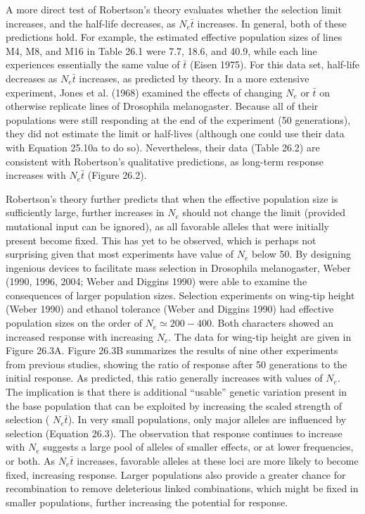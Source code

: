 \documentclass{article}
\begin{document}
A more direct test of Robertson’s theory evaluates whether the selection limit increases, and the half-life decreases, as  $ N_{e}\bar{t} $ increases. In general, both of these predictions hold. For example, the estimated effective population sizes of lines M4, M8, and M16 in Table 26.1 were 7.7, 18.6, and 40.9, while each line experiences essentially the same value of  $ \bar{t} $ (Eisen 1975). For this data set, half-life decreases as  $ N_{e}\bar{t} $ increases, as predicted by theory. In a more extensive experiment, Jones et al. (1968) examined the effects of changing  $ N_{e} $ or  $ \bar{t} $ on otherwise replicate lines of Drosophila melanogaster. Because all of their populations were still responding at the end of the experiment (50 generations), they did not estimate the limit or half-lives (although one could use their data with Equation 25.10a to do so). Nevertheless, their data (Table 26.2) are consistent with Robertson’s qualitative predictions, as long-term response increases with  $ N_{e}\bar{t} $ (Figure 26.2).

Robertson's theory further predicts that when the effective population size is sufficiently large, further increases in  $ N_e $ should not change the limit (provided mutational input can be ignored), as all favorable alleles that were initially present become fixed. This has yet to be observed, which is perhaps not surprising given that most experiments have value of  $ N_e $ below 50. By designing ingenious devices to facilitate mass selection in Drosophila melanogaster, Weber (1990, 1996, 2004; Weber and Diggins 1990) were able to examine the consequences of larger population sizes. Selection experiments on wing-tip height (Weber 1990) and ethanol tolerance (Weber and Diggins 1990) had effective population sizes on the order of  $ N_e \simeq 200-400 $. Both characters showed an increased response with increasing  $ N_e $. The data for wing-tip height are given in Figure 26.3A. Figure 26.3B summarizes the results of nine other experiments from previous studies, showing the ratio of response after 50 generations to the initial response. As predicted, this ratio generally increases with values of  $ N_e $. The implication is that there is additional “usable” genetic variation present in the base population that can be exploited by increasing the scaled strength of selection ( $ N_e \bar{t} $). In very small populations, only major alleles are influenced by selection (Equation 26.3). The observation that response continues to increase with  $ N_e $ suggests a large pool of alleles of smaller effects, or at lower frequencies, or both. As  $ N_e \bar{t} $ increases, favorable alleles at these loci are more likely to become fixed, increasing response. Larger populations also provide a greater chance for recombination to remove deleterious linked combinations, which might be fixed in smaller populations, further increasing the potential for response.
\end{document}
